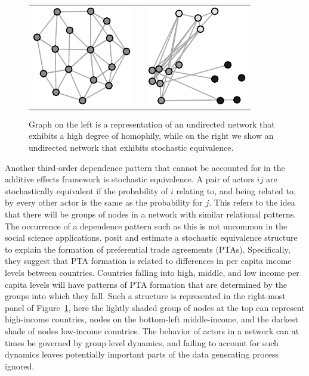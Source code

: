 \documentclass[12pt,pdflatex]{elsarticle}
\begin{document}
\begin{figure}[ht]
	\centering
	\begin{tabular}{lcr}
	\includegraphics[width=.33\textwidth]{homophNet} & \hspace{2cm} &
	\includegraphics[width=.33\textwidth]{stochEquivNet}	
	\end{tabular}
	\caption{Graph on the left is a representation of an undirected network that exhibits a high degree of homophily, while on the right we show an undirected network that exhibits stochastic equivalence. }
	\label{fig:homphStochEquivNet}
\end{figure}

Another third-order dependence pattern that cannot be accounted for in the additive effects framework is stochastic equivalence. A pair of actors $ij$ are stochastically equivalent if the probability of $i$ relating to, and being related to, by every other actor is the same as the probability for $j$. This refers to the idea that there will be groups of nodes in a network with similar relational patterns. The occurrence of a dependence pattern such as this is not uncommon in the social science applications. \citet{manger:etal:2012} posit and estimate a stochastic equivalence structure to explain the formation of preferential trade agreements (PTAs). 
Specifically, they suggest that PTA formation is related to differences in per capita income levels between countries. Countries falling into high, middle, and low income per capita levels will have patterns of PTA formation that are determined by the groups into which they fall. %
Such a structure is represented in the right-most panel of Figure~\ref{fig:homphStochEquivNet}, here the lightly shaded group of nodes at the top can represent high-income countries, nodes on the bottom-left middle-income, and the darkest shade of nodes low-income countries. The behavior of actors in a network can at times be governed by group level dynamics, and failing to account for such dynamics leaves potentially important parts of the data generating process ignored. 
\end{document}
